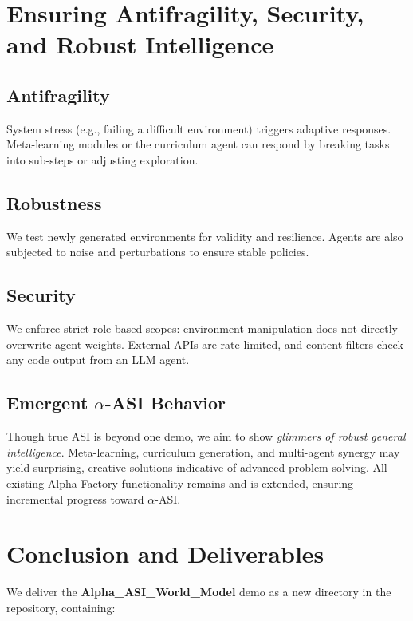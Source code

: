 \documentclass{article}
\begin{document}
\section{Ensuring Antifragility, Security, and Robust Intelligence}

\subsection{Antifragility}
System stress (e.g., failing a difficult environment) triggers adaptive responses. Meta-learning modules or the curriculum agent can respond by breaking tasks into sub-steps or adjusting exploration.

\subsection{Robustness}
We test newly generated environments for validity and resilience. Agents are also subjected to noise and perturbations to ensure stable policies.

\subsection{Security}
We enforce strict role-based scopes: environment manipulation does not directly overwrite agent weights. External APIs are rate-limited, and content filters check any code output from an LLM agent.

\subsection{Emergent \boldmath$\alpha$-ASI Behavior}
Though true ASI is beyond one demo, we aim to show \emph{glimmers of robust general intelligence}. Meta-learning, curriculum generation, and multi-agent synergy may yield surprising, creative solutions indicative of advanced problem-solving. All existing Alpha-Factory functionality remains and is extended, ensuring incremental progress toward \(\alpha\)-ASI.

\section{Conclusion and Deliverables}
We deliver the \textbf{Alpha\_ASI\_World\_Model} demo as a new directory in the repository, containing:
\end{document}
